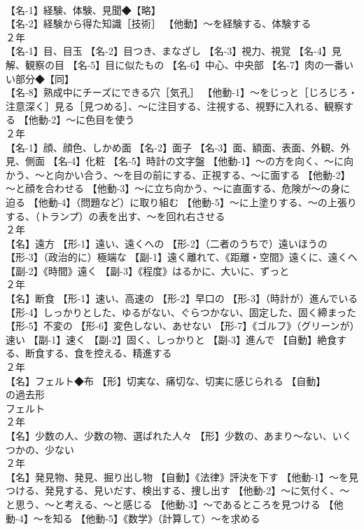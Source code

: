 \documentclass[8pt]{extreport}
\begin{document}
\begin{CJK}{UTF8}{min}
\\	【名-1】経験、体験、見聞◆【略】
\\	【名-2】経験から得た知識［技術］ 【他動】～を経験する、体験する
\\	２年	
\\	【名-1】目、目玉 【名-2】目つき、まなざし 【名-3】視力、視覚 【名-4】見解、観察の目 【名-5】目に似たもの 【名-6】中心、中央部 【名-7】肉の一番いい部分◆【同】
\\	【名-8】熟成中にチーズにできる穴［気孔］ 【他動-1】～をじっと［じろじろ・注意深く］見る［見つめる］、～に注目する、注視する、視野に入れる、観察する 【他動-2】～に色目を使う
\\	２年	
\\	【名-1】顔、顔色、しかめ面 【名-2】面子 【名-3】面、額面、表面、外観、外見、側面 【名-4】化粧 【名-5】時計の文字盤 【他動-1】～の方を向く、～に向かう、～と向かい合う、～を目の前にする、正視する、～に面する 【他動-2】～と顔を合わせる 【他動-3】～に立ち向かう、～に直面する、危険が～の身に迫る 【他動-4】（問題など）に取り組む 【他動-5】～に上塗りする、～の上張りする、（トランプ）の表を出す、～を回れ右させる
\\	２年	
\\	【名】遠方 【形-1】遠い、遠くへの 【形-2】（二者のうちで）遠いほうの 【形-3】（政治的に）極端な 【副-1】遠く離れて、《距離・空間》遠くに、遠くへ 【副-2】《時間》遠く 【副-3】《程度》はるかに、大いに、ずっと
\\	２年	
\\	【名】断食 【形-1】速い、高速の 【形-2】早口の 【形-3】（時計が）進んでいる 【形-4】しっかりとした、ゆるがない、ぐらつかない、固定した、固く締まった 【形-5】不変の 【形-6】変色しない、あせない 【形-7】《ゴルフ》（グリーンが）速い 【副-1】速く 【副-2】固く、しっかりと 【副-3】進んで 【自動】絶食する、断食する、食を控える、精進する
\\	２年	
\\	【名】フェルト◆布 【形】切実な、痛切な、切実に感じられる 【自動】
\\	の過去形 
\\	フェルト
\\	２年	
\\	【名】少数の人、少数の物、選ばれた人々 【形】少数の、あまり～ない、いくつかの、少ない
\\	２年	
\\	【名】発見物、発見、掘り出し物 【自動】《法律》評決を下す 【他動-1】～を見つける、発見する、見いだす、検出する、捜し出す 【他動-2】～に気付く、～と思う、～と考える、～と感じる 【他動-3】～であるところを見つける 【他動-4】～を知る 【他動-5】《数学》（計算して）～を求める

\end{CJK}
\end{document}
